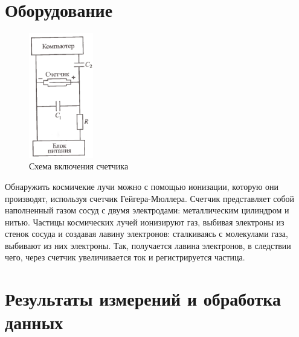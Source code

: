 \documentclass[a4paper,12pt]{article}
\begin{document}
\section{Оборудование}
\begin{figure}[H]
\centering
\includegraphics[width=0.25\textwidth]{счётчик}
\caption{Схема включения счетчика}
\end{figure}

Обнаружить космичекие лучи можно с помощью ионизации, которую они производят, используя счетчик Гейгера-Мюллера. Счетчик представляет собой наполненный газом сосуд с двумя электродами: металлическим цилиндром и нитью. Частицы космических лучей ионизируют газ, выбивая электроны из стенок сосуда и создавая лавину электронов: сталкиваясь с молекулами газа, выбивают из них электроны. Так, получается лавина электронов, в следствии чего, через счетчик увеличивается ток и регистрируется частица.

\section{Результаты измерений и обработка данных}
\end{document}
